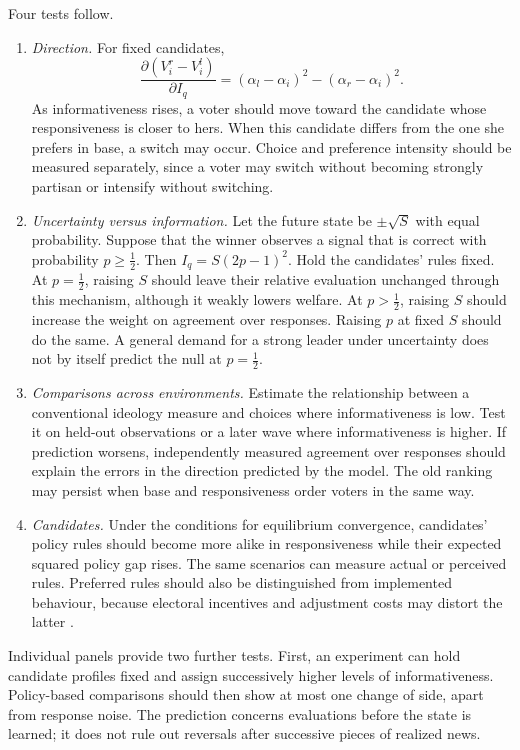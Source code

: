 \documentclass[12pt,letterpaper]{article}
\begin{document}
Four tests follow.
\begin{enumerate}
  \item[(i)] \emph{Direction.} For fixed candidates,
  \[
  \frac{\partial(V_i^r-V_i^l)}{\partial I_q}=(\alpha_l-\alpha_i)^2-(\alpha_r-\alpha_i)^2.
  \]
  As informativeness rises, a voter should move toward the candidate whose responsiveness is closer to hers. When this candidate differs from the one she prefers in base, a switch may occur. Choice and preference intensity should be measured separately, since a voter may switch without becoming strongly partisan or intensify without switching.

  \item[(ii)] \emph{Uncertainty versus information.} Let the future state be $\pm\sqrt S$ with equal probability. Suppose that the winner observes a signal that is correct with probability $p\ge\tfrac12$. Then $I_q=S(2p-1)^2$. Hold the candidates' rules fixed. At $p=\tfrac12$, raising $S$ should leave their relative evaluation unchanged through this mechanism, although it weakly lowers welfare. At $p>\tfrac12$, raising $S$ should increase the weight on agreement over responses. Raising $p$ at fixed $S$ should do the same. A general demand for a strong leader under uncertainty does not by itself predict the null at $p=\tfrac12$.

  \item[(iii)] \emph{Comparisons across environments.} Estimate the relationship between a conventional ideology measure and choices where informativeness is low. Test it on held-out observations or a later wave where informativeness is higher. If prediction worsens, independently measured agreement over responses should explain the errors in the direction predicted by the model. The old ranking may persist when base and responsiveness order voters in the same way.

  \item[(iv)] \emph{Candidates.} Under the conditions for equilibrium convergence, candidates' policy rules should become more alike in responsiveness while their expected squared policy gap rises. The same scenarios can measure actual or perceived rules. Preferred rules should also be distinguished from implemented behaviour, because electoral incentives and adjustment costs may distort the latter \citep{CanesWroneShotts2007,LoeperDziuda2024}.
\end{enumerate}

Individual panels provide two further tests. First, an experiment can hold candidate profiles fixed and assign successively higher levels of informativeness. Policy-based comparisons should then show at most one change of side, apart from response noise. The prediction concerns evaluations before the state is learned; it does not rule out reversals after successive pieces of realized news.
\end{document}
